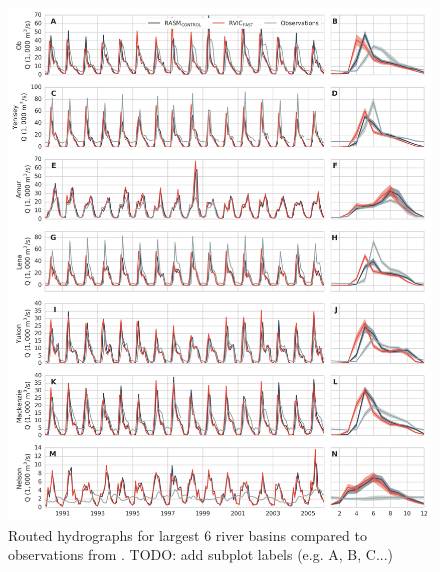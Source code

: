 \documentclass[jgrga, draft]{agutex}
\begin{document}
\clearpage
\begin{figure}
\noindent\includegraphics[width=40pc,natwidth=1]{R1010RBRbaaa01a_rvicfast_hydrographs}
\caption{Routed hydrographs for largest 6 river basins compared to observations from \citet{Dai_2009}. TODO: add subplot labels (e.g. A, B, C...)}
\label{fig:hydrographs}
\end{figure}
\end{document}
